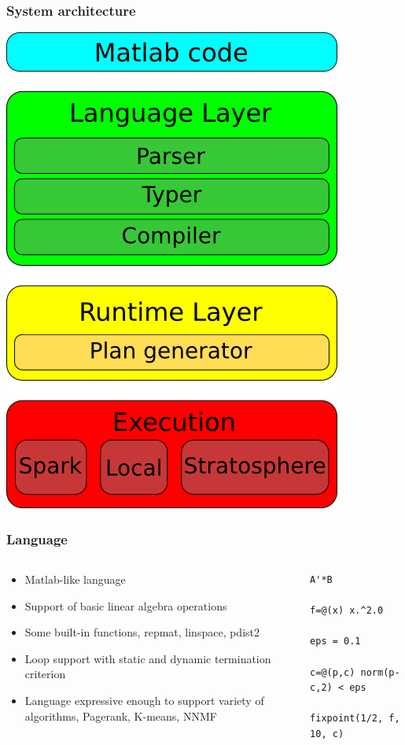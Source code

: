 \begin{frame}
	\frametitle{System architecture}
	\begin{center}
		\includegraphics[height=0.8\textheight]{images/architecture.png}
	\end{center}
\end{frame}

\begin{frame}[fragile]
	\frametitle{Language}
	\begin{columns}
		\begin{column}{0.65\textwidth}
			\begin{itemize}
				\item Matlab-like language
				\item Support of basic linear algebra operations
				\item Some built-in functions, repmat, linspace, pdist2
				\item Loop support with static and dynamic termination criterion
				\item Language expressive enough to support variety of algorithms, Pagerank, K-means, NNMF
			\end{itemize}
		\end{column}
		\begin{column}{0.35\textwidth}
			\begin{lstlisting}[basicstyle=\scriptsize]
A'*B

f=@(x) x.^2.0

eps = 0.1

c=@(p,c) norm(p-c,2) < eps

fixpoint(1/2, f, 10, c)
			\end{lstlisting}
		\end{column}
	\end{columns}
\end{frame}

